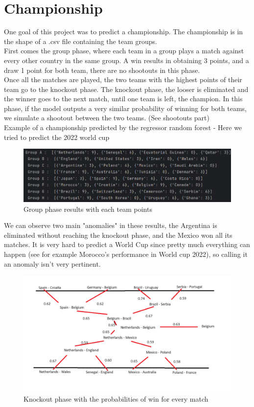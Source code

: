 \newpage
\section{Championship}
One goal of this project was to predict a championship.
The championship is in the shape of a .csv file containing the team groups.\\

\noindent First comes the group phase, where each team in a group plays a match against every other country in the same group. A win results in obtaining 3 points, and a draw 1 point for both team, there are no shootouts in this phase.\\

\noindent Once all the matches are played, the two teams with the highest points of their team go to the knockout phase. 
The knockout phase, the looser is eliminated and the winner goes to the next match, until one team is left, the champion.
In this phase, if the model outputs a very similar probability of winning for both teams, we simulate a shootout between the two teams. (See shootouts part)\\

\noindent Example of a championship predicted by the regressor random forest -
Here we tried to predict the 2022 world cup
\begin{figure}[h]
  \centering
  \includegraphics[width=0.8\linewidth]{cdmGroupPhase.png}
  \caption{Group phase results with each team points}
\end{figure}

We can observe two main "anomalies" in these results, the Argentina is eliminated without reaching the knockout phase, and the Mexico won all its matches.
It is very hard to predict a World Cup since pretty much everything can happen (see for example Morocco's performance in World cup 2022), so calling it an anomaly isn't very pertinent.

\begin{figure}[h]
  \centering
  \includegraphics[width=0.8\linewidth]{championshipPaint.png}
  \caption{Knockout phase with the probabilities of win for every match}
\end{figure}

